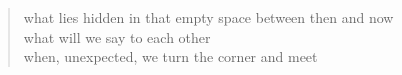 
\begin{verse}
what lies hidden in that empty space between then and now \\
what will we say to each other \\
when, unexpected, we turn the corner and meet
\end{verse}
